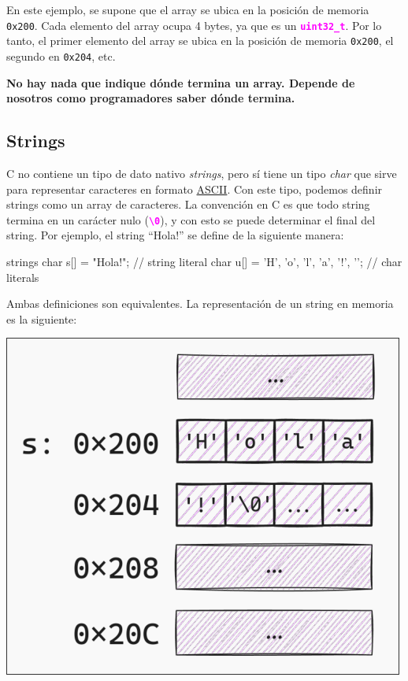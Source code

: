 \documentclass[]{scrartcl}
\newcommand{\hl}[1]{\textcolor{magenta}{\textbf{\texttt{#1}}}}
\begin{document}
En este ejemplo, se supone que el array se ubica en la posición de memoria \texttt{0x200}. Cada elemento del array ocupa 4 bytes, ya que es un \hl{uint32\_t}. Por lo tanto, el primer elemento del array se ubica en la posición de memoria \texttt{0x200}, el segundo en \texttt{0x204}, etc.

\begin{importantbox}
  \centering
  \textbf{No hay nada que indique dónde termina un array. Depende de nosotros como programadores saber dónde termina.}
\end{importantbox}


\subsection*{Strings}
C no contiene un tipo de dato nativo \textit{strings}, pero sí tiene un tipo \textit{char} que sirve para representar caracteres en formato \href{https://www.asciitable.com/}{ASCII}. Con este tipo, podemos definir strings como un array de caracteres.
La convención en C es que todo string termina en un carácter nulo (\hl{\textquotesingle\textbackslash0}\textquotesingle), y con esto se puede determinar el final del string. Por ejemplo, el string ``Hola!'' se define de la siguiente manera:


\begin{cbox}[]{strings}
  char s[] = "Hola!";                         // string literal
  char u[] = {'H', 'o', 'l', 'a', '!', '\0'}; // char literals
\end{cbox}

Ambas definiciones son equivalentes. La representación de un string en memoria es la siguiente:

\begin{center}
  \includegraphics[scale=0.3]{./img/string_memoria.png}
  \label{fig:string}
\end{center}
\end{document}
